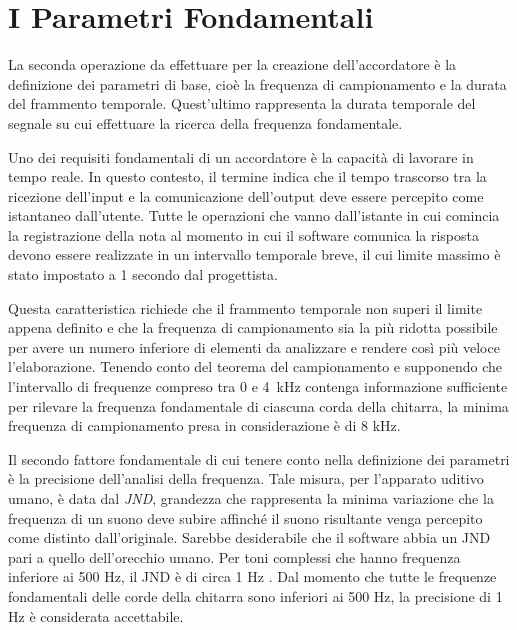 \chapter{I Parametri Fondamentali}\label{cap:parametri}

La seconda operazione da effettuare per la creazione dell'accordatore è la definizione dei parametri di base, cioè la frequenza di campionamento e la durata del frammento temporale.
Quest'ultimo rappresenta la durata temporale del segnale su cui effettuare la ricerca della frequenza fondamentale.  

Uno dei requisiti fondamentali di un accordatore è la capacità di lavorare in tempo reale. 
In questo contesto, il termine indica che il tempo trascorso tra la ricezione dell'input e la comunicazione dell'output deve essere percepito come istantaneo dall'utente. 
Tutte le operazioni che vanno dall'istante in cui comincia la registrazione della nota al momento in cui il software comunica la risposta devono essere realizzate in un intervallo temporale breve, il cui limite massimo è stato impostato a 1 secondo dal progettista. 

Questa caratteristica richiede che il frammento temporale non superi il limite appena definito e che la frequenza di campionamento sia la più ridotta possibile per avere un numero inferiore di elementi da analizzare e rendere così più veloce l'elaborazione.
Tenendo conto del teorema del campionamento e supponendo che l'intervallo di frequenze compreso tra 0 e \mbox{4 kHz} contenga informazione sufficiente per rilevare la frequenza fondamentale di ciascuna corda della chitarra, la minima frequenza di campionamento presa in considerazione è di 8 kHz.

Il secondo fattore fondamentale di cui tenere conto nella definizione dei parametri è la precisione dell'analisi della frequenza.
Tale misura, per l'apparato uditivo umano, è data dal \emph{JND}, grandezza che rappresenta la minima variazione che la frequenza di un suono deve subire affinché il suono risultante venga percepito come distinto dall'originale.
Sarebbe desiderabile che il software abbia un \mbox{JND} pari a quello dell'orecchio umano. 
Per toni complessi che hanno frequenza inferiore ai 500 Hz, il \mbox{JND} è di circa 1 Hz \cite{BenestySondhiHuang2008}. 
Dal momento che tutte le frequenze fondamentali delle corde della chitarra sono inferiori ai 500 Hz, la precisione di 1 Hz è considerata accettabile.

